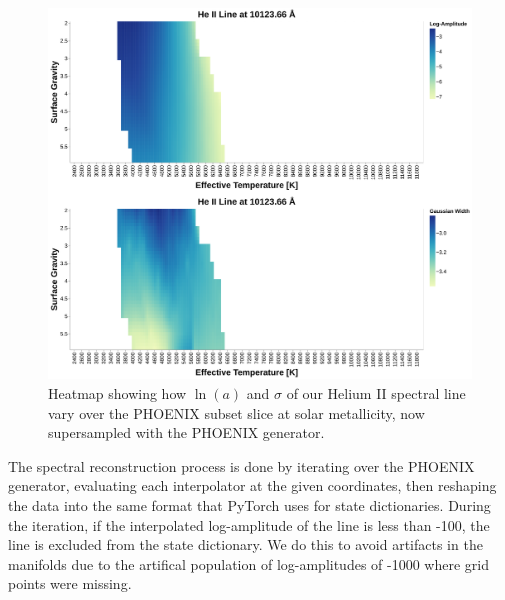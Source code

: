 \documentclass[twocolumn, linenumbers]{aastex631}
\begin{document}
\begin{figure}
    \centering
    \includegraphics[width=\textwidth]{figure6}
    \caption{Heatmap showing how $\ln(a)$ and $\sigma$ of our Helium II spectral line vary over the PHOENIX subset slice at solar metallicity, now supersampled with the PHOENIX generator.}
    \label{fig:figure6}
\end{figure}

The spectral reconstruction process is done by iterating over the PHOENIX generator, evaluating each interpolator at the given coordinates, then reshaping the data into the same format that PyTorch uses for state dictionaries. 
During the iteration, if the interpolated log-amplitude of the line is less than -100, the line is excluded from the state dictionary. 
We do this to avoid artifacts in the manifolds due to the artifical population of log-amplitudes of -1000 where grid points were missing.
\end{document}
